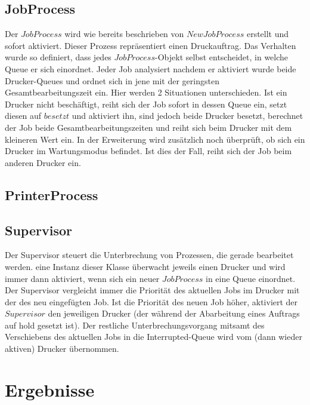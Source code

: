 \documentclass[12pt,a4paper]{article}
\begin{document}
	\subsection{JobProcess}
	Der $JobProcess$ wird wie bereits beschrieben von $NewJobProcess$ erstellt und sofort aktiviert. Dieser Prozess repräsentiert einen Druckauftrag. Das Verhalten wurde so definiert, dass jedes
	$JobProcess$-Objekt selbst entscheidet, in welche Queue er sich einordnet. Jeder Job analysiert nachdem er aktiviert wurde beide Drucker-Queues und ordnet sich in jene mit der geringsten
	Gesamtbearbeitungszeit ein. Hier werden 2 Situationen unterschieden. Ist ein Drucker nicht beschäftigt, reiht sich der Job sofort in dessen Queue ein, setzt diesen auf $besetzt$ und aktiviert ihn, sind 
	jedoch beide Drucker besetzt, berechnet der Job beide Gesamtbearbeitungszeiten und reiht sich beim Drucker mit dem kleineren Wert ein. In der Erweiterung wird zusätzlich noch überprüft, ob sich ein Drucker im			Wartungsmodus befindet. Ist dies der Fall, reiht sich der Job beim anderen Drucker ein.
	
	\subsection{PrinterProcess}
	
	\subsection{Supervisor}
	Der Supervisor steuert die Unterbrechung von Prozessen, die gerade bearbeitet werden. eine Instanz dieser Klasse überwacht jeweils einen Drucker und wird immer dann aktiviert, wenn sich ein 
	neuer $JobProcess$ in eine Queue einordnet. Der Supervisor vergleicht immer die Priorität des aktuellen Jobs im Drucker mit der des neu eingefügten Job. Ist die Priorität des neuen Job höher, aktiviert
	der $Supervisor$ den jeweiligen Drucker (der während der Abarbeitung eines Auftrags auf hold gesetzt ist). Der restliche Unterbrechungsvorgang mitsamt des Verschiebens des aktuellen Jobs in die
	Interrupted-Queue wird vom (dann wieder aktiven) Drucker übernommen.
	
	
	\section{Ergebnisse}
	
	
\end{document}
